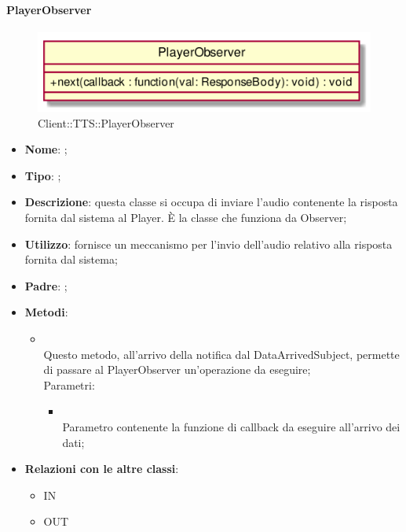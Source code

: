 \hypertarget{PlayerObserver_label}{\paragraph{PlayerObserver}}
\begin{figure}[h]
	\centering
	\includegraphics[width=\textwidth,height=\textheight,keepaspectratio]{images/ClassPlayerObserver.png}
	\caption{Client::TTS::PlayerObserver}
\end{figure}
\begin{itemize}
	\item \textbf{Nome}: ;
	\item \textbf{Tipo}: ;
	\item \textbf{Descrizione}: questa classe si occupa di inviare l'audio contenente la risposta fornita dal sistema al Player.
È la classe che funziona da Observer;
	\item \textbf{Utilizzo}: fornisce un meccanismo per l'invio dell'audio relativo alla risposta fornita dal sistema;
	\item \textbf{Padre}: ;
	\item \textbf{Metodi}:
	\begin{itemize}
		\item[]  \\
		Questo metodo, all'arrivo della notifica dal DataArrivedSubject, permette di passare al PlayerObserver un'operazione da eseguire;\\
		Parametri:
		\begin{itemize}
			\item {} \\
			Parametro contenente la funzione di callback da eseguire all'arrivo dei dati;
		\end{itemize}
	\end{itemize}
	\item \textbf{Relazioni con le altre classi}:
	\begin{itemize}
		\item IN \hyperlink{DataArrivedObservable_label}{}
		\item OUT \hyperlink{Player_label}{}
	\end{itemize}
\end{itemize}
\FloatBarrier

